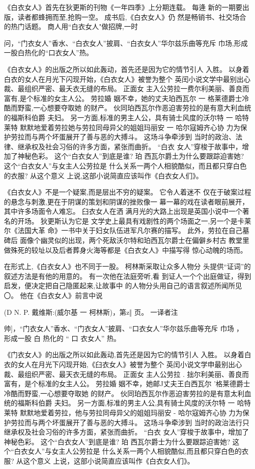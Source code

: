\documentclass[portrait,a4paper]{article}
\begin{document}
《白衣女人》首先在狄更斯的刊物《一年四季》上分期连载。 每逄
新的一期要出版，读者都蜂拥而至,抢购一空。 成书后,《白衣女人》仍
然是畅销书、社交场合的热门话题。 商人用“白衣女人"做招牌,一时

问，“门衣女人”香水、“白衣女人”披肩、“白衣女人”华尔兹乐曲等充斥
巾场,形成一股白热化的“口衣女人”热。

《白衣女人》的出版之所以如此轰动，首先还是因为它的情节引人
入胜。 以身着白衣的女人在月光下闪现开始，《白衣女人》被誉为整个
英闰小说文学中最别出心裁、最组织严密、最夭衣无缝的布局。 正面女
主入公劳拉一费尔利美丽、善良而富有,是个标准的女主人公。 劳拉婚
姻不幸，她的丈夫珀西瓦尔 一 格莱德爵士冷酷而野蛮,一心想要夺取她
的财产。 伙同珀西瓦尔作恶迫害劳拉的是有意大利血统的福斯科伯爵
夫妇。 另一方面,标准的男主人公，具有骑士风度的沃尔特 一 哈特莱特
默默地爱着劳拉她与劳拉同母异父的姐姐玛丽安 一 哈尔寇姆齐心协
力为保护劳拉而与两个坏蛋展开了善与恶的大搏斗。 这场斗争牵涉到
当时的政治、法律、继承权及社会习俗的许多方面，紧张而曲折。 “白衣
女人”穿梭于故事中，增加了神秘色彩。 这个“白衣女人”到底是谁? 珀
西瓦尔爵土为什么要跟踪迫害她? 这个“白衣女人”与女主人公劳拉是
什么关系一两个人相貌酷似，而且都只穿白色的衣服? 从这个意义
上说,这部小说简直应该叫作《白衣女人们》。

《白衣女人》不是一个疑案,而是层出不穷的疑案。 它令人着迷不
仅在于破案过程的悬念与刺激,更在于阴谋的策划和阴谋的挫败像一
幕一幕的戏在读者眼前展开，其中许多场面令人难忘。 臼衣女人在洒
满月光的大路上出现是英国小说中一个著名的开场。 狄更斯认为它是
文学史上最具有戏剧性的两个场面之一,另一个是卡莱尔《法国大革
命》一书中关于妇女队伍进军凡尔赛的描写。 此外，劳拉在自己墓碑后
面像个幽灵似的出现，两个死敌沃尔特和珀西瓦尔爵士在偏僻乡村古
教堂里做殊死的较址以及后者葬身火海等都是《白衣女人》中描写得
惊心动魄的场而。

在形式上,《白衣女人》也不同于一股。 柯林斯采取让众多人物分
头提供“证词”的叙述方法是有他的用意的。 有一次他在法庭旁听,看
到证人一个个出庭做证，得到启发，便决定把自己隐匿起来,让故事中
的人物分头用自己的语言叙述所闻所见〇。 他在《白衣女人》前言中说

(D N. P. 戴维斯:(威尔基 一 柯林斯)，第z‖ 页。 一译者注

帅]，“门衣女人”香水、“门衣女人”披肩、“口衣女人”华尔兹乐曲等充斥
巾场 ， 形成一股 白 热化的 “ 口 衣女人” 热。

《门衣女人》的出版之所以如此轰动,首先还是因为它的情节引人
入胜。 以身着白衣的女人在月光下闪现开始,《臼衣女人》被誉为整个
英闰小说文学申最别出心裁、最组织严密、最天衣无缝的布局。 正面女
主人公劳拉 . 拙尔利美丽、善良而富有，是个标准的女主人公。 劳拉婚
姻不幸，她邮J丈夫王白西瓦尔 '格莱德爵士冷酷而野蛮,一心想要夺取她
的财产。 伙同珀西瓦尔作恶迫害劳拉的是有意太利血统的福斯科伯爵
夫妇。 另一方面,标准的男主人公,具有骑士风度的沃尔特 一 哈特莱特
默默地爱着劳拉，他与劳拉同母异父的姐姐玛丽安 - 哈尔寇姆齐心协
力为保护劳拉而与两个坏蛋展开了善与恶的大搏斗。 这场斗争牵涉到
当时的政治法行只继承权及社会习俗的许多方面，紧张而曲折。 “白衣
女人”穿梭于故事中，增加了神秘色彩。 这个“白衣女人”到底是谁? 珀
西瓦尔爵士为什么要跟踪迫害她? 这个“白衣女人”与女主人公劳拉是
什么关系一两个人相貌酷似,而且都只穿白色的衣服? 从这个意义
上说，这部小说简直应该叫作《白衣女人们》。
\end{document}
